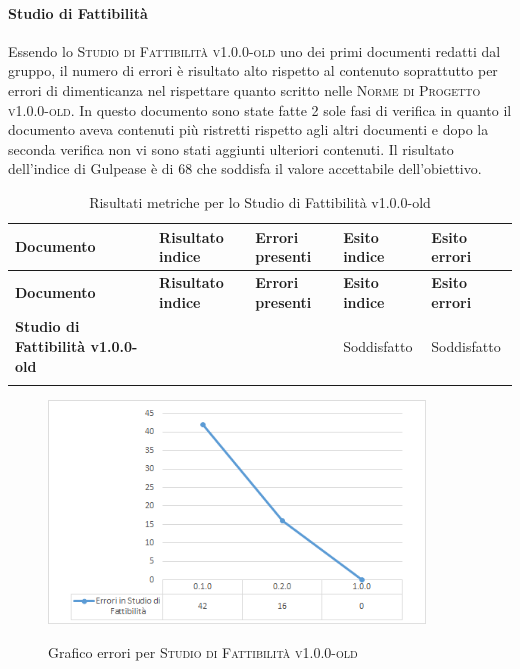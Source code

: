 \documentclass[../piano-di-qualifica.tex]{subfiles}
\begin{document}
\paragraph{Studio di Fattibilità}
\label{sub:studio_di_fattibilita}
Essendo lo \textsc{Studio di Fattibilità v1.0.0-old} uno dei primi documenti redatti dal gruppo, il numero di errori è risultato alto rispetto al contenuto soprattutto per errori di dimenticanza nel rispettare quanto scritto nelle \textsc{Norme di Progetto v1.0.0-old}.
In questo documento sono state fatte 2 sole fasi di verifica in quanto il documento aveva contenuti più ristretti rispetto agli altri documenti e dopo la seconda verifica non vi sono stati aggiunti ulteriori contenuti.
Il risultato dell'indice di Gulpease è di 68 che soddisfa il valore accettabile dell'obiettivo.

\renewcommand{\arraystretch}{2} %
\begin{longtable}[H]{>{\centering\bfseries}m{6cm} >{\centering}m{2cm} >{\centering}m{2.5cm} >{\centering}m{2.5cm} >{\centering\arraybackslash}m{2.5cm}}  
  \rowcolor{lightgray}
  {\textbf{Documento}} & {\textbf{Risultato indice}} & {\textbf{Errori presenti}} & {\textbf{Esito indice}} & {\textbf{Esito errori}}  \\
  \endfirsthead%
  \rowcolor{lightgray}
  {\textbf{Documento}} & {\textbf{Risultato indice}} & {\textbf{Errori presenti}} & {\textbf{Esito indice}} & {\textbf{Esito errori}}  \\
  \endhead%
  \textbf{Studio di Fattibilità v1.0.0-old} & 68                 & 0               & Soddisfatto & Soddisfatto \\
  \caption{Risultati metriche per lo Studio di Fattibilità v1.0.0-old}
  \label{tab:my-table}
\end{longtable}

    \begin{figure}[H]
        \centering
        \includegraphics[width=10cm]{img/erroriStudio.png}
        \label{fig:scice_documenti}
        \caption{Grafico errori per \textsc{Studio di Fattibilità v1.0.0-old}}
    \end{figure}
\end{document}
